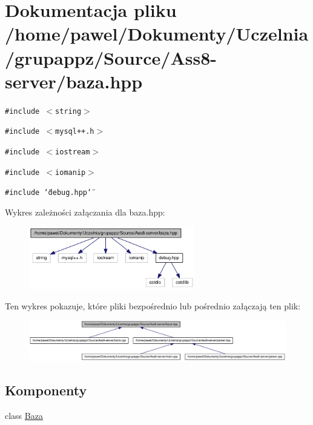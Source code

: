 \hypertarget{a00007}{
\section{Dokumentacja pliku /home/pawel/Dokumenty/Uczelnia/grupappz/Source/Ass8-server/baza.hpp}
\label{de/d5e/a00007}
}
{\tt \#include $<$string$>$}\par
{\tt \#include $<$mysql++.h$>$}\par
{\tt \#include $<$iostream$>$}\par
{\tt \#include $<$iomanip$>$}\par
{\tt \#include \char`\"{}debug.hpp\char`\"{}}\par


Wykres zależności załączania dla baza.hpp:\nopagebreak
\begin{figure}[H]
\begin{center}
\leavevmode
\includegraphics[width=204pt]{d4/d8c/a00035}
\end{center}
\end{figure}


Ten wykres pokazuje, które pliki bezpośrednio lub pośrednio załączają ten plik:\nopagebreak
\begin{figure}[H]
\begin{center}
\leavevmode
\includegraphics[width=420pt]{de/d8c/a00036}
\end{center}
\end{figure}
\subsection*{Komponenty}
\begin{CompactItemize}
\item 
class \hyperlink{a00001}{Baza}
\end{CompactItemize}
